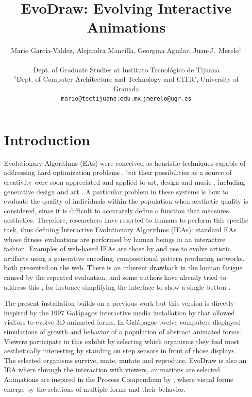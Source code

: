 \documentclass[letterpaper]{article}
\title{EvoDraw: Evolving Interactive Animations}
\author{ Mario Garc\'ia-Valdez, Alejandra Mancilla, Georgina Aguilar, Juan-J.~Merelo$^1$\\
\mbox{}\\
Dept. of Graduate Studies at Instituto Tecnol\'ogico de Tijuana \\
$^1$Dept. of Computer Architecture and Technology and CITIC, 
University of Granada \\
{\tt mario@tectijuana.edu.mx},{\tt jmerelo@ugr.es}}
\begin{document}
\maketitle


\section{Introduction} 

Evolutionary Algorithms (EAs) were conceived as heuristic techniques 
capable of addressing hard optimization problems 
\citep{DBLP:books/daglib/0015527},  but their possibilities as a source of
creativity were soon appreciated and applied to art, design and music \citep{ie1}, including generative design and
art \citep{Bentley:1999:intro,Sims:1991,todd:1992}.  A particular problem in
these systems is how to evaluate the quality of individuals within the population
when aesthetic quality is considered, since it is difficult to
accurately define a function that measures aesthetics. Therefore, researchers
have resorted to humans to perform this specific task, thus defining Interactive
Evolutionary Algorithms (IEAs): standard EAs whose fitness evaluations are
performed by human beings in an interactive fashion. Examples of web-based IEAs are
those by \cite{picbreeder} and \cite{forms}
use  to evolve artistic artifacts using a generative encoding, compositional
pattern producing networks, both presented on the web.
There is an inherent drawback in the human fatigue caused by the repeated evaluation, and some authors have
already tried to address this \citep{Frade:2010:EvoGAMES}, for instance simplifying the interface to show a single button \citep{davies2016evolving}. %

The present installation builds on a previous work \citep{garcia2013evospace}
but this version is directly inspired by the 1997 Galápagos interactive 
media installation by \cite{galapagos} that allowed visitors to evolve 3D animated forms. 
In Gal{\'a}pagos twelve computers displayed simulations of growth and 
behavior of a population of abstract animated forms. Viewers
participate in this exhibit by selecting which organisms they find
most aesthetically interesting by standing on step sensors in front 
of those displays. The selected organisms survive, mate, mutate and 
reproduce. EvoDraw is also an IEA where through the interaction
with viewers, animations are selected. Animations are inspired in 
the Process Compendium by \cite{reas:2004}, where visual forms 
emerge by the relations of multiple forms and their behavior. 
\end{document}
